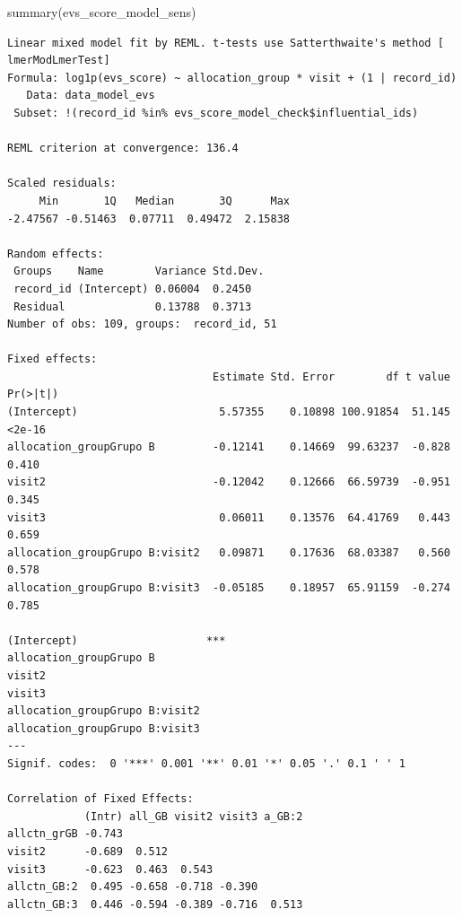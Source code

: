 \documentclass[
  letterpaper,
  DIV=11,
  numbers=noendperiod]{scrartcl}
\newenvironment{Shaded}{\begin{snugshade}}{\end{snugshade}}
\newcommand{\FunctionTok}[1]{\textcolor[rgb]{0.28,0.35,0.67}{#1}}
\newcommand{\NormalTok}[1]{\textcolor[rgb]{0.00,0.23,0.31}{#1}}
\newcommand{\SpecialCharTok}[1]{\textcolor[rgb]{0.37,0.37,0.37}{#1}}
\begin{document}
\begin{Shaded}
\begin{Highlighting}[]
\FunctionTok{summary}\NormalTok{(evs\_score\_model\_sens)}
\end{Highlighting}
\end{Shaded}

\begin{verbatim}
Linear mixed model fit by REML. t-tests use Satterthwaite's method [
lmerModLmerTest]
Formula: log1p(evs_score) ~ allocation_group * visit + (1 | record_id)
   Data: data_model_evs
 Subset: !(record_id %in% evs_score_model_check$influential_ids)

REML criterion at convergence: 136.4

Scaled residuals: 
     Min       1Q   Median       3Q      Max 
-2.47567 -0.51463  0.07711  0.49472  2.15838 

Random effects:
 Groups    Name        Variance Std.Dev.
 record_id (Intercept) 0.06004  0.2450  
 Residual              0.13788  0.3713  
Number of obs: 109, groups:  record_id, 51

Fixed effects:
                                Estimate Std. Error        df t value Pr(>|t|)
(Intercept)                      5.57355    0.10898 100.91854  51.145   <2e-16
allocation_groupGrupo B         -0.12141    0.14669  99.63237  -0.828    0.410
visit2                          -0.12042    0.12666  66.59739  -0.951    0.345
visit3                           0.06011    0.13576  64.41769   0.443    0.659
allocation_groupGrupo B:visit2   0.09871    0.17636  68.03387   0.560    0.578
allocation_groupGrupo B:visit3  -0.05185    0.18957  65.91159  -0.274    0.785
                                  
(Intercept)                    ***
allocation_groupGrupo B           
visit2                            
visit3                            
allocation_groupGrupo B:visit2    
allocation_groupGrupo B:visit3    
---
Signif. codes:  0 '***' 0.001 '**' 0.01 '*' 0.05 '.' 0.1 ' ' 1

Correlation of Fixed Effects:
            (Intr) all_GB visit2 visit3 a_GB:2
allctn_grGB -0.743                            
visit2      -0.689  0.512                     
visit3      -0.623  0.463  0.543              
allctn_GB:2  0.495 -0.658 -0.718 -0.390       
allctn_GB:3  0.446 -0.594 -0.389 -0.716  0.513
\end{verbatim}

\begin{Shaded}
\end{Shaded}
\end{document}
